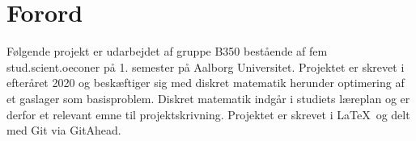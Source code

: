 \chapter{Forord}
Følgende projekt er udarbejdet af gruppe B350 bestående af fem stud.scient.oeconer på 1. semester på Aalborg Universitet. Projektet er skrevet i efteråret 2020 og beskæftiger sig med diskret matematik herunder optimering af et gaslager som basisproblem. Diskret matematik indgår i studiets læreplan og er derfor et relevant emne til projektskrivning. Projektet er skrevet i \LaTeX \ og delt med Git via GitAhead.







%
%
%
%
%
%
%
